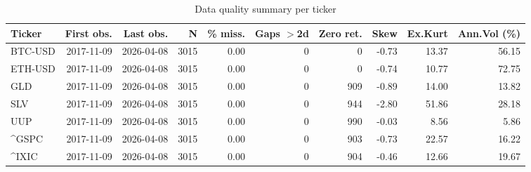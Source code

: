 \begin{table}[H]
\centering
\small
\caption{Data quality summary per ticker}
\label{tab:data_quality}
\begin{tabular}{lrrrrrrrrr}
\toprule
Ticker & First obs. & Last obs. & N & \% miss. & Gaps $>$2d & Zero ret. & Skew & Ex.Kurt & Ann.Vol (\%) \\
\midrule
BTC-USD & 2017-11-09 & 2026-04-08 & 3015 & 0.00 & 0 & 0 & -0.73 & 13.37 & 56.15 \\
ETH-USD & 2017-11-09 & 2026-04-08 & 3015 & 0.00 & 0 & 0 & -0.74 & 10.77 & 72.75 \\
GLD & 2017-11-09 & 2026-04-08 & 3015 & 0.00 & 0 & 909 & -0.89 & 14.00 & 13.82 \\
SLV & 2017-11-09 & 2026-04-08 & 3015 & 0.00 & 0 & 944 & -2.80 & 51.86 & 28.18 \\
UUP & 2017-11-09 & 2026-04-08 & 3015 & 0.00 & 0 & 990 & -0.03 & 8.56 & 5.86 \\
^GSPC & 2017-11-09 & 2026-04-08 & 3015 & 0.00 & 0 & 903 & -0.73 & 22.57 & 16.22 \\
^IXIC & 2017-11-09 & 2026-04-08 & 3015 & 0.00 & 0 & 904 & -0.46 & 12.66 & 19.67 \\
\bottomrule
\end{tabular}
\end{table}